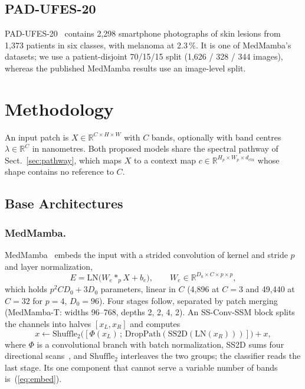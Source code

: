 \documentclass{svproc}
\begin{document}
\subsection{PAD-UFES-20}
PAD-UFES-20~\cite{pad_desc,pad_data} contains 2,298 smartphone photographs of skin lesions from 1,373 patients in six classes, with melanoma at 2.3\,\%. It is one of MedMamba's datasets; we use a patient-disjoint 70/15/15 split (1,626 / 328 / 344 images), whereas the published MedMamba results use an image-level split.

\section{Methodology}
An input patch is $X \in \mathbb{R}^{C \times H \times W}$ with $C$ bands, optionally with band centres $\lambda \in \mathbb{R}^{C}$ in nanometres. Both proposed models share the spectral pathway of Sect.~\ref{sec:pathway}, which maps $X$ to a context map $c \in \mathbb{R}^{H_p \times W_p \times d_{\text{ctx}}}$ whose shape contains no reference to $C$.

\subsection{Base Architectures}
\subsubsection{MedMamba.}
MedMamba~\cite{medmamba} embeds the input with a strided convolution of kernel and stride $p$ and layer normalization,
\begin{equation}
E = \mathrm{LN}\big(W_e \ast_p X + b_e\big), \qquad W_e \in \mathbb{R}^{D_0 \times C \times p \times p},
\label{eq:embed}
\end{equation}
which holds $p^2 C D_0 + 3 D_0$ parameters, linear in $C$ (4,896 at $C=3$ and 49,440 at $C=32$ for $p=4$, $D_0=96$). Four stages follow, separated by patch merging (MedMamba-T: widths 96--768, depths 2, 2, 4, 2). An SS-Conv-SSM block splits the channels into halves $[x_L, x_R]$ and computes
\begin{equation}
x \leftarrow \mathrm{Shuffle}_2\big([\Phi(x_L) \,;\, \mathrm{DropPath}(\mathrm{SS2D}(\mathrm{LN}(x_R)))]\big) + x,
\label{eq:ssconv}
\end{equation}
where $\Phi$ is a convolutional branch with batch normalization, SS2D sums four directional scans~\cite{vmamba}, and $\mathrm{Shuffle}_2$ interleaves the two groups; the classifier reads the last stage. Its one component that cannot serve a variable number of bands is~(\ref{eq:embed}).
\end{document}
